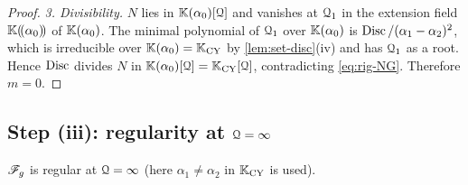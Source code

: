 \begin{proof}
\emph{3. Divisibility.} $N$ lies in $\mathbb{K}(\alpha_0)[\mathcal{Q}]$ and vanishes at $\mathcal{Q}_1$ in the extension field $\mathbb{K}(\!(\alpha_0)\!)$ of $\mathbb{K}(\alpha_0)$. The minimal polynomial of $\mathcal{Q}_1$ over $\mathbb{K}(\alpha_0)$ is $\operatorname{Disc}/(\alpha_1-\alpha_2)^2$, which is irreducible over $\mathbb{K}(\alpha_0)=\mathbb{K}_{\mathrm{CY}}$ by \cref{lem:set-disc}(iv) and has $\mathcal{Q}_1$ as a root. Hence $\operatorname{Disc}$ divides $N$ in $\mathbb{K}(\alpha_0)[\mathcal{Q}]=\mathbb{K}_{\mathrm{CY}}[\mathcal{Q}]$, contradicting \eqref{eq:rig-NG}. Therefore $m=0$.
\end{proof}

\subsection{Step (iii): regularity at \texorpdfstring{$\mathcal{Q}=\infty$}{Q = infinity}}

\begin{lem}
\label{lem:rig-inf}
$\mathscr{F}_g$ is regular at $\mathcal{Q}=\infty$ (here $\alpha_1\neq\alpha_2$ in $\mathbb{K}_{\mathrm{CY}}$ is used).
\end{lem}

